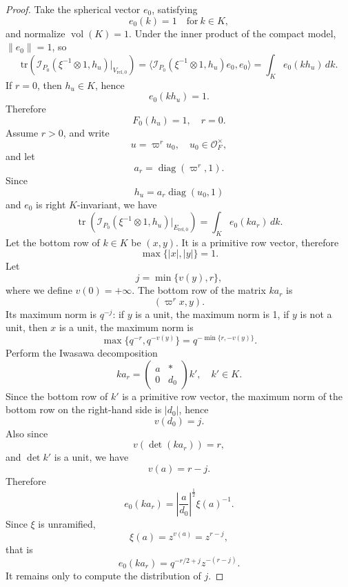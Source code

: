 \documentclass[11pt]{amsart}
\renewcommand{\rm}{\mathrm}
\theoremstyle{definition}
\numberwithin{equation}{section}
\begin{document}
\begin{proof}
		
		Take the spherical vector \(e_0\), satisfying
		\[
		e_0(k) = 1 \quad \text{for}\ k \in K,
		\]
		and normalize \(\operatorname{vol}(K) = 1\). Under the inner product of the compact model, \(\|e_0\| = 1\), so
		\[
		\rm{tr}(\mathscr{I}_{P_0}(\xi^{-1}\otimes 1,h_u)|_{V_{\rm{rel},0}}) = \langle \mathscr{I}_{P_0}(\xi^{-1}\otimes 1,h_u)e_0, e_0 \rangle = \int_K e_0(kh_u) \, dk. 
		\]
		If \(r = 0\), then \(h_u \in K\), hence
		\[
		e_0(kh_u) = 1.
		\]
		Therefore
		\[
		F_0(h_u) = 1, \quad r = 0.
		\]
		Assume \(r > 0\), and write
		\[
		u = \varpi^r u_0, \quad u_0 \in \mathcal{O}_F^\times,
		\]
		and let
		\[
		a_r = \operatorname{diag}(\varpi^r,1).
		\]
		Since
		\[
		h_u = a_r \operatorname{diag}(u_0,1)
		\]
		and \(e_0\) is right \(K\)-invariant, we have
		\[
		\operatorname{tr}(\mathscr{I}_{P_0}(\xi^{-1}\otimes 1,h_u)|_{E_{\rm{rel},0}}) = \int_K e_0(ka_r) \, dk.
		\]
		Let the bottom row of \(k \in K\) be \((x,y)\). It is a primitive row vector, therefore
		\[
		\max\{|x|, |y|\} = 1.
		\]
		Let
		\[
		j = \min\{v(y), r\},
		\]
		where we define \(v(0) = +\infty\).
		The bottom row of the matrix \(ka_r\) is
		\[
		(\varpi^rx,  y).
		\]
		Its maximum norm is \(q^{-j}\): if \(y\) is a unit, the maximum norm is 1, if \(y\) is not a unit, then \(x\) is a unit, the maximum norm is
		\[
		\max\{q^{-r}, q^{-v(y)}\} = q^{-\min\{r, -v(y)\}}.
		\]
		Perform the Iwasawa decomposition
		\[
		ka_r = \begin{pmatrix} a & * \\ 0 & d_0 \end{pmatrix} k', \quad k' \in K.
		\]
		Since the bottom row of \(k'\) is a primitive row vector, the maximum norm of the bottom row on the right-hand side is \(|d_0|\), hence
		\[
		v(d_0) = j.
		\]
		Also since
		\[
		v(\det(ka_r)) = r,
		\]
		and \(\det k'\) is a unit, we have
		\[
		v(a) = r - j.
		\]
		Therefore
		\[
		e_0(ka_r) = \left| \frac{a}{d_0} \right|^{\frac{1}{2}} \xi(a)^{-1}.
		\]
		Since \(\xi\) is unramified,
		\[
		\xi(a) = z^{v(a)} = z^{r-j},
		\]
		that is
		\[
		e_0(ka_r) = q^{-r/2 + j} z^{-(r-j)}.
		\]
		It remains only to compute the distribution of \(j\).
		

\end{proof}
\end{document}
